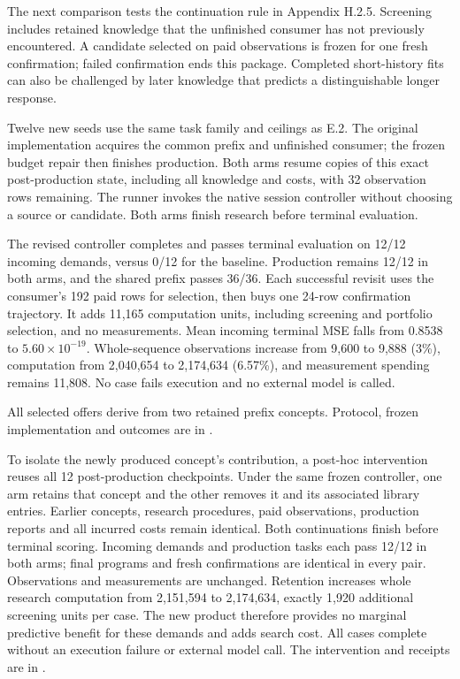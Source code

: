 \documentclass[11pt,a4paper]{article}
\begin{document}
The next comparison tests the continuation rule in Appendix H.2.5. Screening includes
retained knowledge that the unfinished consumer has not previously encountered.
A candidate selected on paid observations is frozen for one fresh confirmation;
failed confirmation ends this package. Completed short-history fits can also be
challenged by later knowledge that predicts a distinguishable longer response.


Twelve new seeds use the same task family and ceilings as E.2. The original
implementation acquires the common prefix and unfinished consumer; the frozen
budget repair then finishes production. Both arms resume copies of this exact
post-production state, including all knowledge and costs, with 32 observation
rows remaining. The runner invokes the native session controller without choosing
a source or candidate. Both arms finish research before terminal evaluation.


The revised controller completes and passes terminal evaluation on 12/12 incoming
demands, versus 0/12 for the baseline. Production remains 12/12 in both arms,
and the shared prefix passes 36/36. Each successful revisit uses the consumer's
192 paid rows for selection, then buys one 24-row confirmation trajectory. It
adds 11,165 computation units, including screening and portfolio selection, and
no measurements. Mean incoming terminal MSE falls from 0.8538 to
\(5.60\times10^{-19}\). Whole-sequence observations increase from 9,600 to 9,888
(3\%), computation from 2,040,654 to 2,174,634 (6.57\%), and measurement spending
remains 11,808. No case fails execution and no external model is called.


All selected offers derive from two retained prefix concepts. Protocol, frozen
implementation and outcomes are in .


To isolate the newly produced concept's contribution, a post-hoc intervention
reuses all 12 post-production checkpoints. Under the same frozen controller, one
arm retains that concept and the other removes it and its associated library
entries. Earlier concepts, research procedures, paid observations, production
reports and all incurred costs remain identical. Both continuations finish
before terminal scoring. Incoming demands and production tasks each pass 12/12
in both arms; final programs and fresh confirmations are identical in every
pair. Observations and measurements are unchanged. Retention increases whole
research computation from 2,151,594 to 2,174,634, exactly 1,920 additional
screening units per case. The new product therefore provides no marginal
predictive benefit for these demands and adds search cost. All cases complete
without an execution failure or external model call. The intervention and
receipts are in .
\end{document}

